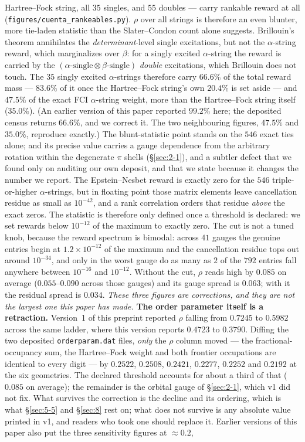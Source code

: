 \documentclass[onecolumn,a4paper]{quantumarticle}
\begin{document}
Hartree--Fock string, all $35$ singles, and $55$ doubles --- carry rankable reward at all (\texttt{figures/cuenta\_rankeables.py}). $\rho$ over all strings is therefore an even blunter, more tie-laden statistic than the Slater--Condon count alone suggests. Brillouin's theorem annihilates the \emph{determinant}-level single excitations, but not the $\alpha$-string reward, which marginalizes over $\beta$: for a singly excited $\alpha$-string the reward is carried by the $(\alpha\text{-single}\otimes\beta\text{-single})$ \emph{double} excitations, which Brillouin does not touch. The $35$ singly excited $\alpha$-strings therefore carry $66.6\%$ of the total reward mass --- $83.6\%$ of it once the Hartree--Fock string's own $20.4\%$ is set aside --- and $47.5\%$ of the exact FCI $\alpha$-string weight, more than the Hartree--Fock string itself ($35.0\%$). (An earlier version of this paper reported $99.2\%$ here; the deposited census returns $66.6\%$, and we correct it. The two neighbouring figures, $47.5\%$ and $35.0\%$, reproduce exactly.) The blunt-statistic point stands on the $546$ exact ties alone; and its precise value carries a gauge dependence from the arbitrary rotation within the degenerate $\pi$ shells (\S\ref{sec:2-1}), and a subtler defect that we found only on auditing our own deposit, and that we state because it changes the number we report. The Epstein--Nesbet reward is exactly zero for the $546$ triple-or-higher $\alpha$-strings, but in floating point those matrix elements leave cancellation residue as small as $10^{-42}$, and a rank correlation orders that residue \emph{above} the exact zeros. The statistic is therefore only defined once a threshold is declared: we set rewards below $10^{-12}$ of the maximum to exactly zero. The cut is not a tuned knob, because the reward spectrum is bimodal: across $41$ gauges the genuine entries begin at $1.2\times10^{-12}$ of the maximum and the cancellation residue tops out around $10^{-34}$, and only in the worst gauge do as many as $2$ of the $792$ entries fall anywhere between $10^{-16}$ and $10^{-12}$. Without the cut, $\rho$ reads high by $0.085$ on average ($0.055$--$0.090$ across those gauges) and its gauge spread is $0.063$; with it the residual spread is $0.034$. \emph{These three figures are corrections, and they are not the largest one this paper has made.} \textbf{The order parameter itself is a retraction.} Version~1 of this preprint reported $\rho$ falling from $0.7245$ to $0.5982$ across the same ladder, where this version reports $0.4723$ to $0.3790$. Diffing the two deposited \texttt{orderparam.dat} files, \emph{only} the $\rho$ column moved --- the fractional-occupancy sum, the Hartree--Fock weight and both frontier occupations are identical to every digit --- by $0.2522$, $0.2508$, $0.2421$, $0.2277$, $0.2252$ and $0.2192$ at the six geometries. The declared threshold accounts for about a third of that ($0.085$ on average); the remainder is the orbital gauge of \S\ref{sec:2-1}, which v1 did not fix. What survives the correction is the decline and its ordering, which is what \S\ref{sec:5-5} and \S\ref{sec:8} rest on; what does not survive is any absolute value printed in v1, and readers who took one should replace it. Earlier versions of this paper also put the three sensitivity figures at ${\approx}0.2$, 
\end{document}
